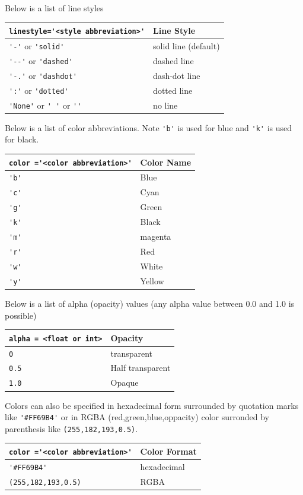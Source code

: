 \documentclass{book}
\begin{document}
Below is a list of line styles

\begin{longtable}[]{@{}ll@{}}
\toprule
\lstinline!linestyle='<style abbreviation>'! & Line Style\tabularnewline
\midrule
\endhead
\lstinline!'-'! or \lstinline!'solid'! & solid line
(default)\tabularnewline
\lstinline!'--'! or \lstinline!'dashed'! & dashed line\tabularnewline
\lstinline!'-.'! or \lstinline!'dashdot'! & dash-dot line\tabularnewline
\lstinline!':'! or \lstinline!'dotted'! & dotted line\tabularnewline
\lstinline!'None'! or \lstinline!' '! or \lstinline!''! & no
line\tabularnewline
\bottomrule
\end{longtable}

Below is a list of color abbreviations. Note \lstinline!'b'! is used for
blue and \lstinline!'k'! is used for black.

\begin{longtable}[]{@{}ll@{}}
\toprule
\lstinline!color ='<color abbreviation>'! & Color Name\tabularnewline
\midrule
\endhead
\lstinline!'b'! & Blue\tabularnewline
\lstinline!'c'! & Cyan\tabularnewline
\lstinline!'g'! & Green\tabularnewline
\lstinline!'k'! & Black\tabularnewline
\lstinline!'m'! & magenta\tabularnewline
\lstinline!'r'! & Red\tabularnewline
\lstinline!'w'! & White\tabularnewline
\lstinline!'y'! & Yellow\tabularnewline
\bottomrule
\end{longtable}

Below is a list of alpha (opacity) values (any alpha value between 0.0
and 1.0 is possible)

\begin{longtable}[]{@{}ll@{}}
\toprule
\lstinline!alpha = <float or int>! & Opacity\tabularnewline
\midrule
\endhead
\lstinline!0! & transparent\tabularnewline
\lstinline!0.5! & Half transparent\tabularnewline
\lstinline!1.0! & Opaque\tabularnewline
\bottomrule
\end{longtable}

Colors can also be specified in hexadecimal form surrounded by quotation
marks like \lstinline!'#FF69B4'! or in RGBA (red,green,blue,oppacity)
color surronded by parenthesis like \lstinline!(255,182,193,0.5)!.

\begin{longtable}[]{@{}ll@{}}
\toprule
\lstinline!color ='<color abbreviation>'! & Color Format\tabularnewline
\midrule
\endhead
\lstinline!'#FF69B4'! & hexadecimal\tabularnewline
\lstinline!(255,182,193,0.5)! & RGBA\tabularnewline
\bottomrule
\end{longtable}
\end{document}
